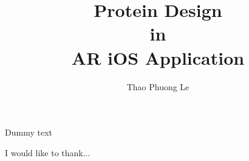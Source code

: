 \documentclass[MSCIM]{mscim}
\begin{document}

\title{Protein Design\\ in \\ AR iOS Application}
\author{Thao Phuong Le}

\beforeabstract

Dummy text

\afterabstract


 I would like to thank...
 
 
\afterpreface




\printbibliography
\end{document}
